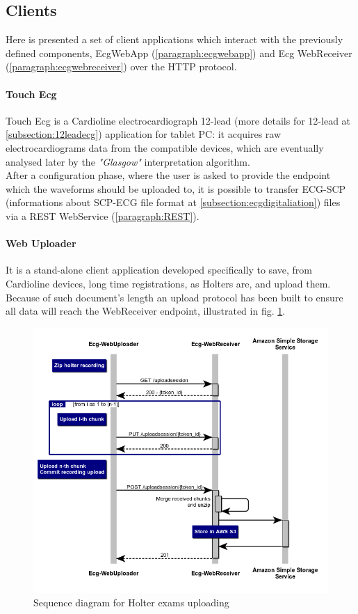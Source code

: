 \clearpage

\subsection{Clients}
Here is presented a set of client applications which interact with the previously defined components, EcgWebApp (\ref{paragraph:ecgwebapp}) and Ecg WebReceiver (\ref{paragraph:ecgwebreceiver}) over the HTTP protocol.
\paragraph{Touch Ecg}
Touch Ecg is a Cardioline electrocardiograph 12-lead (more details for 12-lead at \ref{subsection:12leadecg}) application for tablet PC: it acquires raw electrocardiograms data from the compatible devices, which are eventually analysed later by the \textit{"Glasgow"} \cite{glasgow} interpretation algorithm.\\
After a configuration phase, where the user is asked to provide the endpoint which the waveforms should be uploaded to, it is possible to transfer ECG-SCP (informations about SCP-ECG file format at \ref{subsection:ecgdigitaliation}) files via a REST WebService (\ref{paragraph:REST}).
\paragraph{Web Uploader}
It is a stand-alone client application developed specifically to save, from Cardioline devices, long time registrations, as Holters are, and upload them. Because of such document's length an upload protocol has been built to ensure all data will reach the WebReceiver endpoint, illustrated in fig. \ref{fig:holter_sequence_diagram}.
\begin{figure}[h]
    \includegraphics[width=\textwidth]{img/holter_sequence_diagram}
    \caption{Sequence diagram for Holter exams uploading}
    \label{fig:holter_sequence_diagram}
\end{figure}
